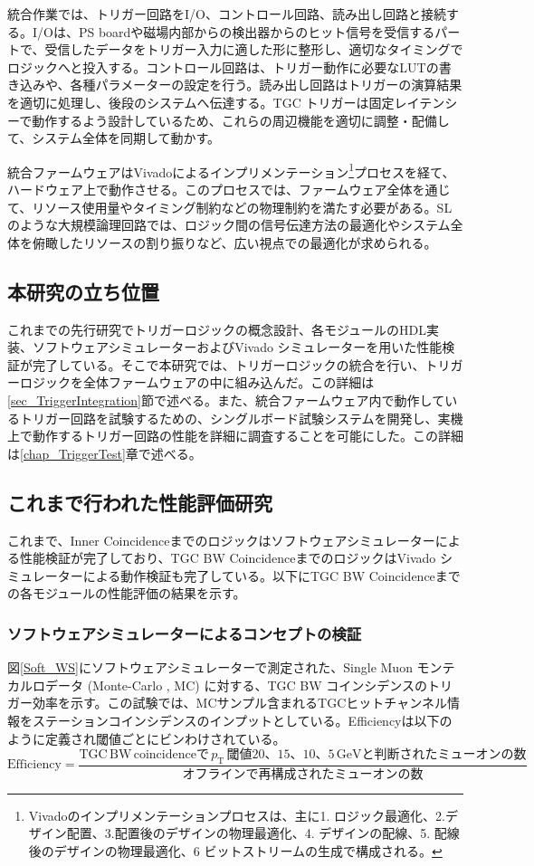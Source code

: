 統合作業では、トリガー回路をI/O、コントロール回路、読み出し回路と接続する。I/Oは、PS boardや磁場内部からの検出器からのヒット信号を受信するパートで、受信したデータをトリガー入力に適した形に整形し、適切なタイミングでロジックへと投入する。コントロール回路は、トリガー動作に必要なLUTの書き込みや、各種パラメーターの設定を行う。読み出し回路はトリガーの演算結果を適切に処理し、後段のシステムへ伝達する。TGC トリガーは固定レイテンシーで動作するよう設計しているため、これらの周辺機能を適切に調整・配備して、システム全体を同期して動かす。

統合ファームウェアはVivadoによるインプリメンテーション\footnote{Vivadoのインプリメンテーションプロセスは、主に1. ロジック最適化、2.デザイン配置、3.配置後のデザインの物理最適化、4. デザインの配線、5. 配線後のデザインの物理最適化、6 ビットストリームの生成で構成される。}プロセスを経て、ハードウェア上で動作させる。このプロセスでは、ファームウェア全体を通じて、リソース使用量やタイミング制約などの物理制約を満たす必要がある。SLのような大規模論理回路では、ロジック間の信号伝達方法の最適化やシステム全体を俯瞰したリソースの割り振りなど、広い視点での最適化が求められる。

\subsection*{本研究の立ち位置}
これまでの先行研究でトリガーロジックの概念設計、各モジュールのHDL実装、ソフトウェアシミュレーターおよびVivado シミュレーターを用いた性能検証が完了している。そこで本研究では、トリガーロジックの統合を行い、トリガーロジックを全体ファームウェアの中に組み込んだ。この詳細は\ref{sec_TriggerIntegration}節で述べる。また、統合ファームウェア内で動作しているトリガー回路を試験するための、シングルボード試験システムを開発し、実機上で動作するトリガー回路の性能を詳細に調査することを可能にした。この詳細は\ref{chap_TriggerTest}章で述べる。

\subsection{これまで行われた性能評価研究}
これまで、Inner Coincidenceまでのロジックはソフトウェアシミュレーターによる性能検証が完了しており、TGC BW CoincidenceまでのロジックはVivado シミュレーターによる動作検証も完了している。以下にTGC BW Coincidenceまでの各モジュールの性能評価の結果を示す。

\subsubsection*{ソフトウェアシミュレーターによるコンセプトの検証}
図\ref{Soft_WS}にソフトウェアシミュレーターで測定された、Single Muon モンテカルロデータ (Monte-Carlo , MC) に対する、TGC BW コインシデンスのトリガー効率を示す。この試験では、MCサンプル含まれるTGCヒットチャンネル情報をステーションコインシデンスのインプットとしている。Efficiencyは以下のように定義され\pt 閾値ごとにビンわけされている。
\begin{equation}
    \mathrm{Efficiency} = \frac{\mathrm{TGC\,BW\,coincidenceで}\,p_{\mathrm{T}}\,閾値20、15、10、5\,\mathrm{GeV}と判断されたミューオンの数}{オフラインで再構成されたミューオンの数}
\end{equation}

